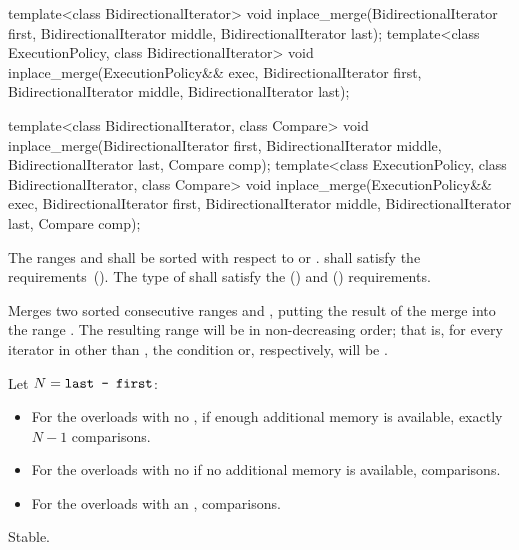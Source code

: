 %
\begin{itemdecl}
template<class BidirectionalIterator>
  void inplace_merge(BidirectionalIterator first,
                     BidirectionalIterator middle,
                     BidirectionalIterator last);
template<class ExecutionPolicy, class BidirectionalIterator>
  void inplace_merge(ExecutionPolicy&& exec,
                     BidirectionalIterator first,
                     BidirectionalIterator middle,
                     BidirectionalIterator last);

template<class BidirectionalIterator, class Compare>
  void inplace_merge(BidirectionalIterator first,
                     BidirectionalIterator middle,
                     BidirectionalIterator last, Compare comp);
template<class ExecutionPolicy, class BidirectionalIterator, class Compare>
  void inplace_merge(ExecutionPolicy&& exec,
                     BidirectionalIterator first,
                     BidirectionalIterator middle,
                     BidirectionalIterator last, Compare comp);
\end{itemdecl}

\begin{itemdescr}
\pnum
\requires
The ranges  and  shall be
sorted with respect to  or .
 shall satisfy the
 requirements~(). The type
of  shall satisfy the
 () and
 () requirements.

\pnum
\effects
Merges two sorted consecutive ranges
and
,
putting the result of the merge into the range
.
The resulting range will be in non-decreasing order;
that is, for every iterator
in
other than
,
the condition
or, respectively,
will be .

\pnum
\complexity Let $N = \texttt{last - first}$:
\begin{itemize}
\item For the overloads with no , if enough additional
memory is available, exactly $N - 1$ comparisons.
\item For the overloads with no  if no additional
memory is available,   comparisons.
\item For the overloads with an ,  comparisons.
\end{itemize}

\pnum
\remarks Stable.
\end{itemdescr}

